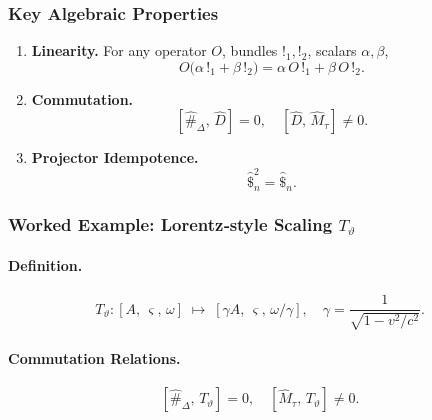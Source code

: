 \subsubsection{Key Algebraic Properties}

\begin{enumerate}
  \item \textbf{Linearity.}  For any operator \(O\), bundles \(!_1, !_2\), scalars \(\alpha,\beta\),
    \begin{equation}
\label{eq:3-1}

      O\bigl(\alpha\,!_1 + \beta\,!_2\bigr)
      = \alpha\,O\,!_1 + \beta\,O\,!_2.
    \end{equation}

  \item \textbf{Commutation.}
    \begin{equation}
\label{eq:3-2}

      [\hat{\#}_\Delta,\,\hat{D}] = 0,
      \quad
      [\hat{D},\,\hat{M}_{\tau}] \neq 0.
    \end{equation}

  \item \textbf{Projector Idempotence.}
    \begin{equation}
\label{eq:3-3}

      \hat{\$}_n^2 = \hat{\$}_n.
    \end{equation}
\end{enumerate}

\subsubsection{Worked Example: Lorentz‐style Scaling \(T_{\vartheta}\)}

\paragraph{Definition.}
\begin{equation}
\label{eq:3-4}

  T_{\vartheta}:[A,\,\varsigma,\,\omega]
    \;\mapsto\;
  [\gamma A,\,\varsigma,\,\omega/\gamma],
  \quad
  \gamma = \frac{1}{\sqrt{1 - v^2/c^2}}.
\end{equation}

\paragraph{Commutation Relations.}
\begin{equation}
\label{eq:3-5}

  [\hat{\#}_\Delta,\,T_{\vartheta}] = 0,
  \quad
  [\hat{M}_{\tau},\,T_{\vartheta}] \neq 0.
\end{equation}

